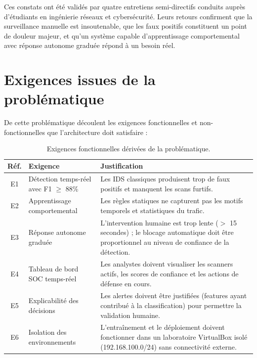\documentclass[12pt,a4paper]{article}
\begin{document}
Ces constats ont \'{e}t\'{e} valid\'{e}s par quatre entretiens semi-directifs
conduits aupr\`{e}s d'\'{e}tudiants en ing\'{e}nierie r\'{e}seaux et
cybers\'{e}curit\'{e}. Leurs retours confirment que la surveillance manuelle
est insoutenable, que les faux positifs constituent un point de douleur majeur,
et qu'un syst\`{e}me capable d'apprentissage comportemental avec r\'{e}ponse
autonome gradu\'{e}e r\'{e}pond \`{a} un besoin r\'{e}el.

\section{Exigences issues de la probl\'{e}matique}

De cette probl\'{e}matique d\'{e}coulent les exigences fonctionnelles et
non-fonctionnelles que l'architecture doit satisfaire :

\begin{table}[h!]
\centering
\small
\begin{tabularx}{\textwidth}{c L{4cm} X}
\toprule
\textbf{R\'{e}f.} & \textbf{Exigence} & \textbf{Justification} \\
\midrule
E1 & D\'{e}tection temps-r\'{e}el avec F1 $\geq$ 88\% & Les IDS classiques
    produisent trop de faux positifs et manquent les scans furtifs. \\
E2 & Apprentissage comportemental & Les r\`{e}gles statiques ne capturent pas
    les motifs temporels et statistiques du trafic. \\
E3 & R\'{e}ponse autonome gradu\'{e}e & L'intervention humaine est trop lente
    ($>$ 15 secondes) ; le blocage automatique doit \^{e}tre proportionnel
    au niveau de confiance de la d\'{e}tection. \\
E4 & Tableau de bord SOC temps-r\'{e}el & Les analystes doivent visualiser
    les scanners actifs, les scores de confiance et les actions de d\'{e}fense
    en cours. \\
E5 & Explicabilit\'{e} des d\'{e}cisions & Les alertes doivent \^{e}tre
    justifi\'{e}es (features ayant contribu\'{e} \`{a} la classification)
    pour permettre la validation humaine. \\
E6 & Isolation des environnements & L'entra\^{i}nement et le d\'{e}ploiement
    doivent fonctionner dans un laboratoire VirtualBox isol\'{e}
    (192.168.100.0/24) sans connectivit\'{e} externe. \\
\bottomrule
\end{tabularx}
\caption{Exigences fonctionnelles d\'{e}riv\'{e}es de la probl\'{e}matique.}
\label{tab:exigences}
\end{table}
\end{document}
